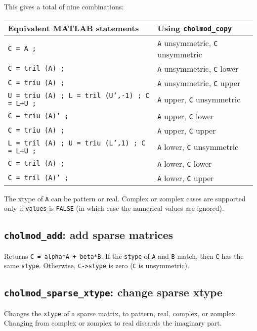 \documentclass[11pt]{article}
\begin{document}
\noindent
This gives a total of nine combinations: \newline
\begin{tabular}{ll}
\hline
Equivalent MATLAB statements			    & Using {\tt cholmod\_copy} \\
\hline
{\tt C = A ;						   }& {\tt A} unsymmetric, {\tt C} unsymmetric \\
{\tt C = tril (A) ;					   }& {\tt A} unsymmetric, {\tt C} lower \\
{\tt C = triu (A) ;					   }& {\tt A} unsymmetric, {\tt C} upper \\
{\tt U = triu (A) ; L = tril (U',-1) ; C = L+U ;	   }& {\tt A} upper, {\tt C} unsymmetric \\
{\tt C = triu (A)' ;					   }& {\tt A} upper, {\tt C} lower \\
{\tt C = triu (A) ;					   }& {\tt A} upper, {\tt C} upper \\
{\tt L = tril (A) ; U = triu (L',1) ; C = L+U ;		   }& {\tt A} lower, {\tt C} unsymmetric \\
{\tt C = tril (A) ;					   }& {\tt A} lower, {\tt C} lower \\
{\tt C = tril (A)' ;					   }& {\tt A} lower, {\tt C} upper \\
\hline
\end{tabular}

\vspace{0.1in}
The xtype of {\tt A} can be pattern or real.  Complex or zomplex cases are supported only
if {\tt values} is {\tt FALSE} (in which case the numerical values are ignored).

\newpage \subsection{{\tt cholmod\_add}: add sparse matrices}


Returns {\tt C = alpha*A + beta*B}.
If the {\tt stype} of {\tt A} and {\tt B} match, then {\tt C} has
the same {\tt stype}.  Otherwise, {\tt C->stype} is zero ({\tt C} is
unsymmetric).

\subsection{{\tt cholmod\_sparse\_xtype}: change sparse xtype}


Changes the {\tt xtype} of a sparse matrix, to pattern, real, complex, or zomplex.
Changing from complex or zomplex to real discards the imaginary part.
\end{document}
